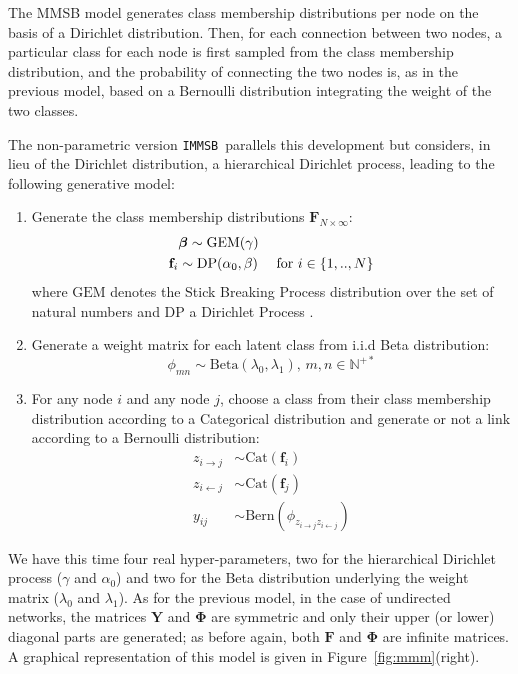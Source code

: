 \documentclass[journal]{IEEEtran}
\renewcommand{\text}{\textnormal}
\newcommand{\imb}{\texttt{IMMSB}}
\newcommand{\gem}{\mathrm{GEM}}
\newcommand{\DP}{\mathrm{DP}}
\newcommand{\mat}[1]{\mathbf{#1}}
\begin{document}
The MMSB model generates class membership distributions per node on the basis of a Dirichlet distribution. Then, for each connection between two nodes, a particular class for each node is first sampled from the class membership distribution, and the probability of connecting the two nodes is, as in the previous model, based on a Bernoulli distribution integrating the weight of the two classes. 

The non-parametric version \imb\ parallels this development but considers, in lieu of the Dirichlet distribution, a hierarchical Dirichlet process, leading to the following generative model:
%
\begin{enumerate}
\item Generate the class membership distributions $\mat{F}_{N \times \infty}$:
   \begin{align}
    &\bm{\beta} \sim \gem(\gamma) \nonumber \\
    \mat{f}_i &\sim \DP(\alpha_0, \beta) \quad\text{ for }  i \in \{1, .., N\} \nonumber
   \end{align}
where $\gem$ denotes the Stick Breaking Process distribution over the set of natural numbers and $\DP$ a Dirichlet Process  \cite{HDP}.
\item Generate a weight matrix for each latent class from i.i.d Beta distribution:\\
\[ \phi_{mn} \sim \mathrm{Beta}(\lambda_0,\lambda_1), \, m,n \in \mathbb{N}^{+*} \]
\item For any node $i$ and any node $j$, choose a class from their class membership distribution according to a Categorical distribution and generate or not a link according to a Bernoulli distribution:
   \begin{align}
    z_{i \rightarrow j} &\sim \mbox{Cat}(\mat{f}_i) \nonumber \\
    z_{i \leftarrow j} &\sim \mbox{Cat}(\mat{f}_j) \nonumber \\
    y_{ij} &\sim \mathrm{Bern}(\phi_{z_{i \rightarrow j}z_{i \leftarrow j}})
    \label{eq:link-immsb}
   \end{align}
\end{enumerate}
%
We have this time four real hyper-parameters, two for the hierarchical Dirichlet process ($\gamma$ and $\alpha_0$) and two for the Beta distribution underlying the weight matrix ($\lambda_0$ and $\lambda_1$). As for the previous model, in the case of undirected networks, the matrices $\mat{Y}$ and $\mat{\Phi}$ are symmetric and only their upper (or lower) diagonal parts are generated; as before again, both $\mat{F}$ and $\mat{\Phi}$ are infinite matrices. A graphical representation of this model is given in Figure~\ref{fig:mmm}(right).
\end{document}
